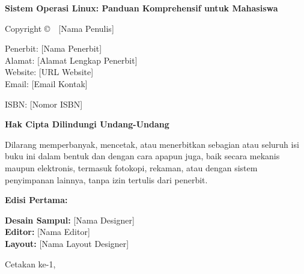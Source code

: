 
\thispagestyle{empty}

\vspace*{10cm}

\noindent
\textbf{Sistem Operasi Linux: Panduan Komprehensif untuk Mahasiswa}

\vspace{1cm}

\noindent
Copyright \copyright\ \the\year\ [Nama Penulis]

\vspace{0.5cm}

\noindent
Penerbit: [Nama Penerbit]\\
Alamat: [Alamat Lengkap Penerbit]\\
Website: [URL Website]\\
Email: [Email Kontak]

\vspace{0.5cm}

\noindent
ISBN: [Nomor ISBN]

\vspace{0.5cm}

\noindent
\textbf{Hak Cipta Dilindungi Undang-Undang}

\vspace{0.3cm}

\noindent
Dilarang memperbanyak, mencetak, atau menerbitkan sebagian atau seluruh isi buku ini
dalam bentuk dan dengan cara apapun juga, baik secara mekanis maupun elektronis,
termasuk fotokopi, rekaman, atau dengan sistem penyimpanan lainnya, tanpa izin
tertulis dari penerbit.

\vspace{0.5cm}

\noindent
\textbf{Edisi Pertama:} \the\year

\vspace{0.3cm}

\noindent
\textbf{Desain Sampul:} [Nama Designer]\\
\textbf{Editor:} [Nama Editor]\\
\textbf{Layout:} [Nama Layout Designer]

\vspace{1cm}

\noindent
Cetakan ke-1, \the\year

\cleardoublepage
